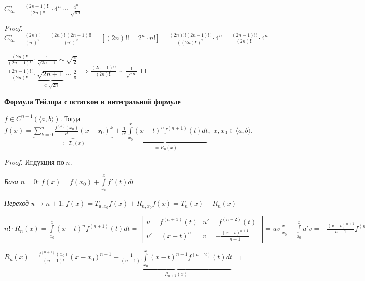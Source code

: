 \begin{corollary}
    $C_{2n}^n=\frac{(2n-1)!!}{(2n)!!}\cdot 4^n\sim \frac{4^n}{\sqrt{\pi n}}$
\end{corollary}

\begin{proof}
    $C_{2n}^n=\frac{(2n)!}{(n!)^2}=\frac{(2n)!!(2n-1)!!}{(n!)^2}=[(2n)!!=2^n\cdot n!]=\frac{(2n)!!(2n-1)!!}{((2n)!!)^2}\cdot 4^n=\frac{(2n-1)!!}{(2n)!!}\cdot 4^n$

    
    $\begin{matrix} \frac{(2n)!!}{(2n-1)!!}\cdot \frac{1}{\sqrt{2n+1}}\sim \sqrt{\frac{\pi}{2}} \\
    \frac{(2n-1)!!}{(2n)!!}\cdot \underbrace{\sqrt{2n+1}}_{<\sqrt{2n}}\sim \frac{2}{\pi}
    \end{matrix}\Rightarrow \frac{(2n-1)!!}{(2n)!!}\sim \frac{1}{\sqrt{\pi n}}$
\end{proof}

\begin{theorem}
    \textbf{Формула Тейлора с остатком в интегральной формуле}

    $f\in C^{n+1}(\langle a, b\rangle)$. Тогда $f(x)=\underbrace{\sum\limits_{k=0}^n\frac{f^{(k)}(x_0)}{k!}(x-x_0)^k}_{:=T_{n}(x)}+\underbrace{\frac{1}{n!}\int\limits_{x_0}^x(x-t)^nf^{(n+1)}(t)dt}_{:=R_{n}(x)},$ $x, x_0\in\langle a, b\rangle$.
\end{theorem}

\begin{proof}
    Индукция по $n$.
    
    \textit{База} $n=0$: $f(x)=f(x_0)+\int\limits_{x_0}^x f'(t)dt$

    \textit{Переход} $n\rightarrow n+1$: $f(x)=T_{n, x_0}f(x)+R_{n, x_0}f(x)=T_n(x)+R_n(x)$

    $n!\cdot R_n(x)=\int\limits_{x_0}^x(x-t)^nf^{(n+1)}(t)dt=\begin{bmatrix*}
        u=f^{(n+1)}(t) & u'=f^{(n+2)}(t) \\
        v' =(x-t)^n & v=-\frac{(x-t)^{n+1}}{n+1}
    \end{bmatrix*}=\left.uv\right|_{x_0}^x-\int\limits_{x_0}^xu'v=\left.-\frac{(x-t)^{n+1}}{n+1}f^{(n+1)}(t)\right|_{x_0}^x-\int\limits_{x_0}^x(-\frac{(x-t)^{n+1}}{n+1}\cdot f^{(n+2)}(t)dt =\frac{(x-x_0)^{n+1}}{n+1}\cdot f^{(n+1)}(x_0)+\frac{1}{n+1}\int\limits_{x_0}^x (x-t)^{n+1}f^{(n+2)}(t)dt$

    $R_n(x)=\frac{f^{(n+1)}(x_0)}{(n+1)!}(x-x_0)^{n+1}+\underbrace{\frac{1}{(n+1)!}\int\limits_{x_0}^x(x-t)^{n+1}f^{(n+2)}(t)dt}_{R_{n+1}(x)}$
\end{proof}

